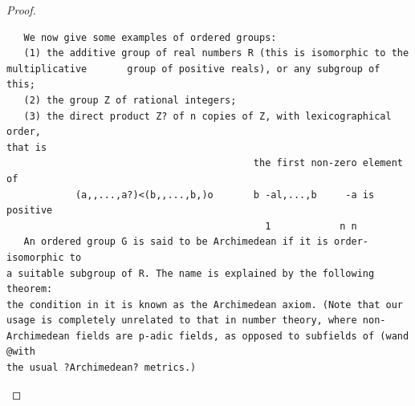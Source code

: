 \begin{proof}
\begin{verbatim}
   We now give some examples of ordered groups:
   (1) the additive group of real numbers R (this is isomorphic to the
multiplicative       group of positive reals), or any subgroup of this;
   (2) the group Z of rational integers;
   (3) the direct product Z? of n copies of Z, with lexicographical order,
that is
                                           the first non-zero element of
            (a,,...,a?)<(b,,...,b,)o       b -al,...,b     -a is positive
                                             1            n n
   An ordered group G is said to be Archimedean if it is order-isomorphic to
a suitable subgroup of R. The name is explained by the following theorem:
the condition in it is known as the Archimedean axiom. (Note that our
usage is completely unrelated to that in number theory, where non-
Archimedean fields are p-adic fields, as opposed to subfields of (wand @with
the usual ?Archimedean? metrics.)
\end{verbatim}
\end{proof}


